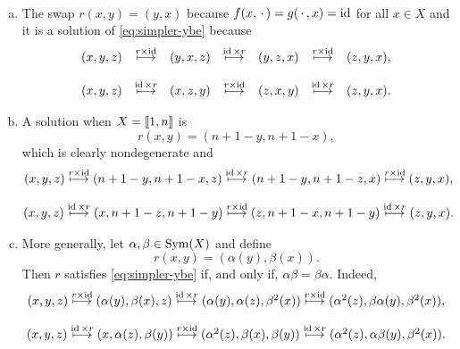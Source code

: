 \begin{xmpls}${}$
    \begin{enumerate}[a),font=\upshape]
        \item The swap $r(x,y)=(y,x)$ because $f(x,\,\cdot\,)=g(\,\cdot\,,x)=\operatorname{id}$ for all $x\in X$ and it is a solution of \eqref{eq:simpler-ybe} because
    $$
    \begin{matrix}
        (x,y,z)&\stackrel{r\times\operatorname{id}}\longmapsto&(y,x,z)
            &\stackrel{\operatorname{id}\times r}\longmapsto&(y,z,x)
            &\stackrel{r\times\operatorname{id}}\longmapsto&(z,y,x),\\\\
        (x,y,z)&\stackrel{\operatorname{id}\times r}\longmapsto&(x,z,y)
            &\stackrel{r\times\operatorname{id}}\longmapsto&(z,x,y)
            &\stackrel{\operatorname{id}\times r}\longmapsto&(z,y,x).        
    \end{matrix}
    $$

    \item A solution when $X=\llbracket1,n\rrbracket$ is
    $$
        r(x,y)=(n+1-y, n+1-x),
    $$
    which is clearly nondegenerate and
    {\small
    $$
        \begin{matrix}
        (x,y,z)\stackrel{r\times\operatorname{id}}\longmapsto(n+1-y,n+1-x,z)
            \stackrel{\operatorname{id}\times r}\longmapsto(n+1-y,n+1-z,x)
            \stackrel{r\times\operatorname{id}}\longmapsto(z,y,x),\\\\
        (x,y,z)\stackrel{\operatorname{id}\times r}\longmapsto(x,n+1-z,n+1-y)
            \stackrel{r\times\operatorname{id}}\longmapsto(z,n+1-x,n+1-y)
            \stackrel{\operatorname{id}\times r}\longmapsto(z,y,x).
        \end{matrix}
    $$
    }

    \item More generally, let $\alpha,\beta\in{\rm Sym}(X)$ and define
    $$
        r(x,y) = (\alpha(y),\beta(x)).
    $$
    Then $r$ satisfies \eqref{eq:simpler-ybe} if, and only if, $\alpha\beta=\beta\alpha$. Indeed,
    {\small
    $$
        \begin{matrix}
        (x,y,z)\stackrel{r\times\operatorname{id}}
            \longmapsto(\alpha(y),\beta(x),z)
            \stackrel{\operatorname{id}\times r}
            \longmapsto(\alpha(y),\alpha(z),\beta^2(x))
            \stackrel{r\times\operatorname{id}}
            \longmapsto(\alpha^2(z),\beta\alpha(y),\beta^2(x)),\\\\
        (x,y,z)\stackrel{\operatorname{id}\times r}
            \longmapsto(x,\alpha(z),\beta(y))
            \stackrel{r\times\operatorname{id}}
            \longmapsto(\alpha^2(z),\beta(x),\beta(y))
            \stackrel{\operatorname{id}\times r}
            \longmapsto(\alpha^2(z),\alpha\beta(y),\beta^2(x)).
        \end{matrix}
    $$}
    \end{enumerate}
\end{xmpls}

